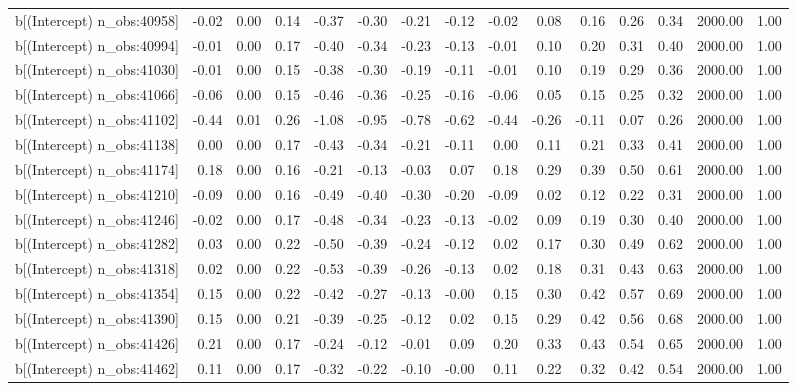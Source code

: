 \begin{table}[ht]
\begin{tabular}{rrrrrrrrrrrrrrr}
  b[(Intercept) n\_obs:40958] & -0.02 & 0.00 & 0.14 & -0.37 & -0.30 & -0.21 & -0.12 & -0.02 & 0.08 & 0.16 & 0.26 & 0.34 & 2000.00 & 1.00 \\ 
  b[(Intercept) n\_obs:40994] & -0.01 & 0.00 & 0.17 & -0.40 & -0.34 & -0.23 & -0.13 & -0.01 & 0.10 & 0.20 & 0.31 & 0.40 & 2000.00 & 1.00 \\ 
  b[(Intercept) n\_obs:41030] & -0.01 & 0.00 & 0.15 & -0.38 & -0.30 & -0.19 & -0.11 & -0.01 & 0.10 & 0.19 & 0.29 & 0.36 & 2000.00 & 1.00 \\ 
  b[(Intercept) n\_obs:41066] & -0.06 & 0.00 & 0.15 & -0.46 & -0.36 & -0.25 & -0.16 & -0.06 & 0.05 & 0.15 & 0.25 & 0.32 & 2000.00 & 1.00 \\ 
  b[(Intercept) n\_obs:41102] & -0.44 & 0.01 & 0.26 & -1.08 & -0.95 & -0.78 & -0.62 & -0.44 & -0.26 & -0.11 & 0.07 & 0.26 & 2000.00 & 1.00 \\ 
  b[(Intercept) n\_obs:41138] & 0.00 & 0.00 & 0.17 & -0.43 & -0.34 & -0.21 & -0.11 & 0.00 & 0.11 & 0.21 & 0.33 & 0.41 & 2000.00 & 1.00 \\ 
  b[(Intercept) n\_obs:41174] & 0.18 & 0.00 & 0.16 & -0.21 & -0.13 & -0.03 & 0.07 & 0.18 & 0.29 & 0.39 & 0.50 & 0.61 & 2000.00 & 1.00 \\ 
  b[(Intercept) n\_obs:41210] & -0.09 & 0.00 & 0.16 & -0.49 & -0.40 & -0.30 & -0.20 & -0.09 & 0.02 & 0.12 & 0.22 & 0.31 & 2000.00 & 1.00 \\ 
  b[(Intercept) n\_obs:41246] & -0.02 & 0.00 & 0.17 & -0.48 & -0.34 & -0.23 & -0.13 & -0.02 & 0.09 & 0.19 & 0.30 & 0.40 & 2000.00 & 1.00 \\ 
  b[(Intercept) n\_obs:41282] & 0.03 & 0.00 & 0.22 & -0.50 & -0.39 & -0.24 & -0.12 & 0.02 & 0.17 & 0.30 & 0.49 & 0.62 & 2000.00 & 1.00 \\ 
  b[(Intercept) n\_obs:41318] & 0.02 & 0.00 & 0.22 & -0.53 & -0.39 & -0.26 & -0.13 & 0.02 & 0.18 & 0.31 & 0.43 & 0.63 & 2000.00 & 1.00 \\ 
  b[(Intercept) n\_obs:41354] & 0.15 & 0.00 & 0.22 & -0.42 & -0.27 & -0.13 & -0.00 & 0.15 & 0.30 & 0.42 & 0.57 & 0.69 & 2000.00 & 1.00 \\ 
  b[(Intercept) n\_obs:41390] & 0.15 & 0.00 & 0.21 & -0.39 & -0.25 & -0.12 & 0.02 & 0.15 & 0.29 & 0.42 & 0.56 & 0.68 & 2000.00 & 1.00 \\ 
  b[(Intercept) n\_obs:41426] & 0.21 & 0.00 & 0.17 & -0.24 & -0.12 & -0.01 & 0.09 & 0.20 & 0.33 & 0.43 & 0.54 & 0.65 & 2000.00 & 1.00 \\ 
  b[(Intercept) n\_obs:41462] & 0.11 & 0.00 & 0.17 & -0.32 & -0.22 & -0.10 & -0.00 & 0.11 & 0.22 & 0.32 & 0.42 & 0.54 & 2000.00 & 1.00 \\ 

\end{tabular}
\end{table}
